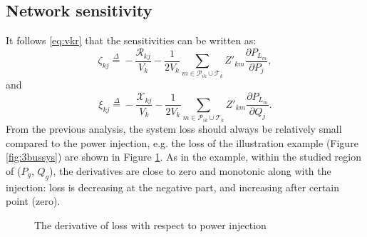 \documentclass{article}
\begin{document}
\subsection{Network sensitivity}
It follows \eqref{eq:vkr} that the sensitivities can be written as: 
\begin{equation}
    \zeta_{kj} \overset{\Delta}{=} -\frac{\mathcal{R}_{kj}}{V_k} -\frac{1}{2V_k}\sum_{m\in\mathcal {P}_{ik}\cup \mathcal{T}_k} Z'_{km} \frac{\partial P_{L_m}}{\partial P_j},
\end{equation}
and
\begin{equation}
    \xi_{kj} \overset{\Delta}{=} -\frac{\mathcal{X}_{kj}}{V_k} -\frac{1}{2V_k}\sum_{m\in\mathcal {P}_{ik}\cup \mathcal{T}_k} Z'_{km} \frac{\partial P_{L_m}}{\partial Q_j}.  
\end{equation} 
From the previous analysis, the system loss should always be relatively small compared to the power injection, e.g. the loss of the illustration example (Figure \ref{fig:3bussys}) are shown in Figure \ref{fig:dldpq}. As in the example, within the studied region of ($P_g$, $Q_g$), the derivatives are close to zero and monotonic along with the injection: loss is decreasing at the negative part, and increasing after certain point (zero).   
\begin{figure}[h!]
    \centering
    \quad
    \caption{The derivative of loss with respect to power injection}
    \label{fig:dldpq}
\end{figure}
\end{document}

